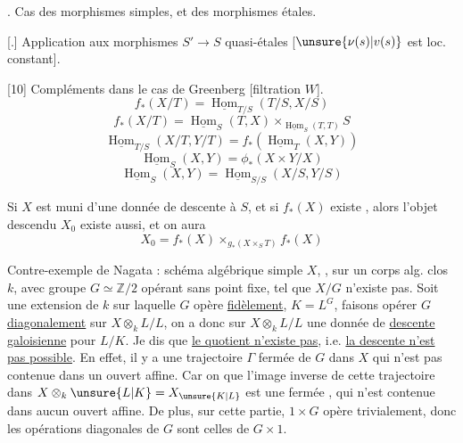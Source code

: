 . Cas des morphismes simples, et des morphismes étales. 

[.] Application aux morphismes $S'\to S$ quasi-étales [$\unsure{\nu(s)|v(s)}$ est loc. constant]. 

[10] Compléments dans le cas de Greenberg [filtration  $W$].
\[
f_*(X/T)=\underline{\operatorname{Hom}}_{T/S}(T/S,X/S)
\]
\[
f_*(X/T)=\underline{\operatorname{Hom}}_S(T,X)\times_{\underline{\operatorname{Hom}}_S(T,T)}S
\]
\[
\underline{\operatorname{Hom}}_{T/S}(X/T,Y/T)=f_*(\underline{\operatorname{Hom}}_T(X,Y))
\]
\[
\underline{\operatorname{Hom}}_S(X,Y)=\phi_*(X\times Y/X)
\]
\[
\underline{\operatorname{Hom}}_S(X,Y)=\underline{\operatorname{Hom}}_{S/S}(X/S,Y/S)
\]

Si $X$ est muni d'une donnée de descente à $S$, et si $f_*(X)$ existe , alors l'objet descendu $X_0$ existe aussi, et on aura
\[
X_0=f_*(X)\times_{g_*(X\times_S T)}f_*(X)
\]

Contre-exemple de Nagata : schéma algébrique simple $X$, , sur un corps alg. clos $k$, avec groupe $G\simeq\mathbb Z/2$ opérant sans point fixe, tel que $X/G$ n'existe pas. Soit  une extension de $k$ sur laquelle $G$ opère \uline{fidèlement},  $K=L^G$, faisons opérer $G$ \uline{diagonalement} sur $X\otimes_k L/L$, on a donc sur $X\otimes_k L/L$ une donnée de \uline{descente galoisienne} pour $L/K$. Je dis que \uline{le quotient n'existe pas}, i.e. \uline{la descente n'est pas possible}. En effet, 
il y a  une trajectoire $\Gamma$ fermée de $G$ dans $X$ qui n'est pas contenue dans un ouvert affine. Car on \uline{} que l'image inverse de cette trajectoire dans $X\otimes_k\unsure{L|K}=X_{\unsure{K|L}}$ est  une   fermée , qui n'est contenue dans aucun ouvert affine.  De plus, sur cette partie, $1\times G$ opère trivialement, donc les opérations  diagonales de $G$ sont celles de $G\times1$.

